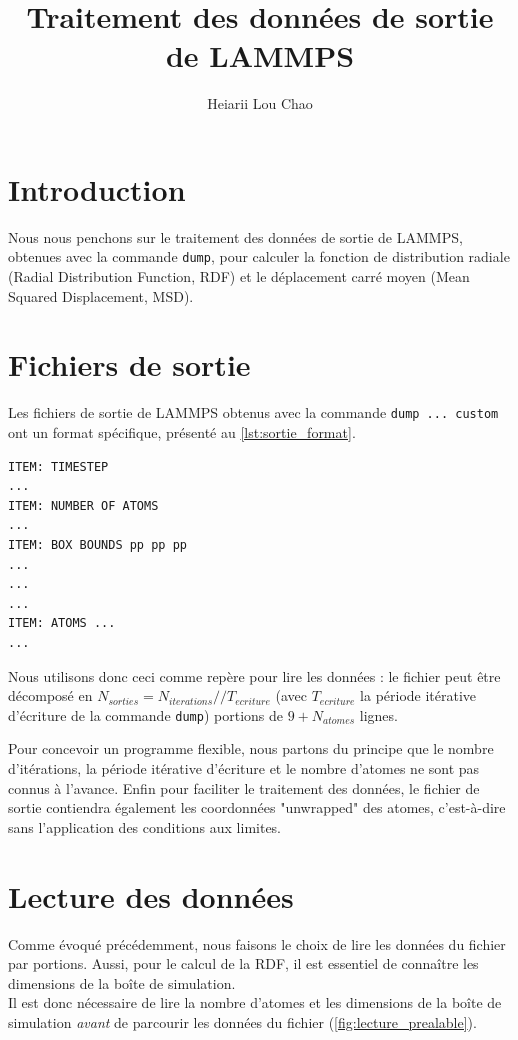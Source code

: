 \documentclass[11pt, a4paper]{article}
\title{Traitement des données de sortie de LAMMPS}
\author{Heiarii Lou Chao}
\begin{document}
\maketitle
\tableofcontents

\clearpage
\section*{Introduction}

Nous nous penchons sur le traitement des données de sortie de LAMMPS, obtenues avec la commande \lstinline!dump!, pour calculer la fonction de distribution radiale (Radial Distribution Function, RDF) et le déplacement carré moyen (Mean Squared Displacement, MSD).

\section{Fichiers de sortie}

Les fichiers de sortie de LAMMPS obtenus avec la commande \lstinline!dump ... custom! ont un format spécifique, présenté au \autoref{lst:sortie_format}.

\begin{lstlisting}[caption={Format des données des fichiers de sortie}, label={lst:sortie_format}, floatplacement={hpbt}]
ITEM: TIMESTEP
...
ITEM: NUMBER OF ATOMS
...
ITEM: BOX BOUNDS pp pp pp
...
...
...
ITEM: ATOMS ...
...
\end{lstlisting}

Nous utilisons donc ceci comme repère pour lire les données : le fichier peut être décomposé en $N_{sorties} = N_{iterations} // T_{ecriture}$ (avec $T_{ecriture}$ la période itérative d'écriture de la commande \lstinline!dump!) portions de $\num{9} + N_{atomes}$ lignes.

Pour concevoir un programme flexible, nous partons du principe que le nombre d'itérations, la période itérative d'écriture et le nombre d'atomes ne sont pas connus à l'avance. Enfin pour faciliter le traitement des données, le fichier de sortie contiendra également les coordonnées "unwrapped" des atomes, c'est-à-dire sans l'application des conditions aux limites.

\section{Lecture des données}

Comme évoqué précédemment, nous faisons le choix de lire les données du fichier par portions. Aussi, pour le calcul de la RDF, il est essentiel de connaître les dimensions de la boîte de simulation.\\
Il est donc nécessaire de lire la nombre d'atomes et les dimensions de la boîte de simulation \emph{avant} de parcourir les données du fichier (\autoref{fig:lecture_prealable}).
\end{document}

